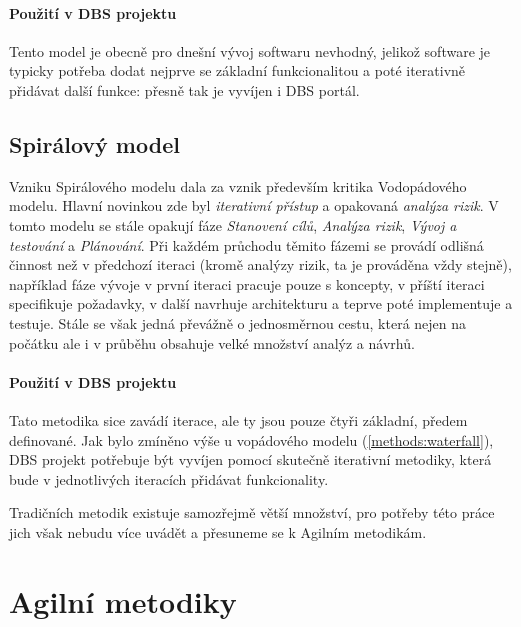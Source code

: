 \paragraph{Použití v DBS projektu}
Tento model je obecně pro dnešní vývoj softwaru nevhodný, jelikož software je typicky potřeba dodat nejprve se základní funkcionalitou a poté iterativně přidávat další funkce: přesně tak je vyvíjen i DBS portál.


\subsection{Spirálový model} \label{methods:spiral}

Vzniku Spirálového modelu dala za vznik především kritika Vodopádového modelu. Hlavní novinkou zde byl \emph{iterativní přístup} a opakovaná \emph{analýza rizik}. V tomto modelu se stále opakují fáze \emph{Stanovení cílů}, \emph{Analýza rizik}, \emph{Vývoj a testování} a \emph{Plánování}. Při každém průchodu těmito fázemi se provádí odlišná činnost než v předchozí iteraci (kromě analýzy rizik, ta je prováděna vždy stejně), například fáze vývoje v první iteraci pracuje pouze s koncepty, v příští iteraci specifikuje požadavky, v další navrhuje architekturu a teprve poté implementuje a testuje.
Stále se však jedná převážně o jednosměrnou cestu, která nejen na počátku ale i v průběhu obsahuje velké množství analýz a návrhů.

\paragraph{Použití v DBS projektu}
Tato metodika sice zavádí iterace, ale ty jsou pouze čtyři základní, předem definované. Jak bylo zmíněno výše u vopádového modelu (\ref{methods:waterfall}), DBS projekt potřebuje být vyvíjen pomocí skutečně iterativní metodiky, která bude v jednotlivých iteracích přidávat funkcionality.

Tradičních metodik existuje samozřejmě větší množství, pro potřeby této práce jich však nebudu více uvádět a přesuneme se k Agilním metodikám.


\section{Agilní metodiky} \label{methods:agile}

